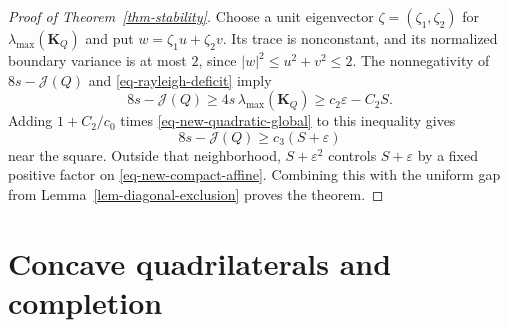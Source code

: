 \documentclass[11pt]{amsart}
\theoremstyle{remark}\newtheorem{remark}[theorem]{Remark}
\numberwithin{equation}{section}
\begin{document}
\begin{proof}[Proof of Theorem~\ref{thm-stability}]
Choose a unit eigenvector $\zeta=(\zeta_1,\zeta_2)$ for
$\lambda_{\max}(\mathbf K_Q)$ and put $w=\zeta_1u+\zeta_2v$.
Its trace is nonconstant, and its normalized boundary variance is at most
$2$, since $|w|^2\le u^2+v^2\le2$.
The nonnegativity of $8s-\mathcal J(Q)$ and
\eqref{eq-rayleigh-deficit} imply
\[
8s-\mathcal J(Q)\ge4s\,\lambda_{\max}(\mathbf K_Q)
\ge c_2\varepsilon-C_2S.
\]
Adding $1+C_2/c_0$ times \eqref{eq-new-quadratic-global} to this inequality gives
\[
8s-\mathcal J(Q)\ge c_3(S+\varepsilon)
\]
near the square. Outside that neighborhood, $S+\varepsilon^2$ controls
$S+\varepsilon$ by a fixed positive factor on
\eqref{eq-new-compact-affine}. Combining this with the uniform gap from
Lemma~\ref{lem-diagonal-exclusion} proves the theorem.
\end{proof}

\section{Concave quadrilaterals and completion}
\end{document}

